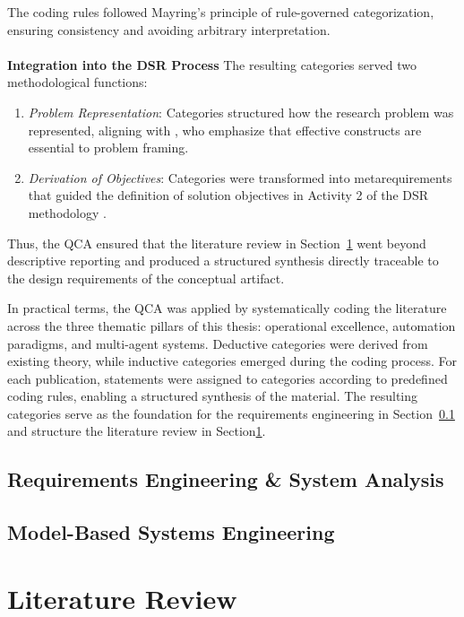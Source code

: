 The coding rules followed Mayring’s principle of rule-governed categorization, ensuring consistency and avoiding arbitrary interpretation.\\\\
\textbf{Integration into the DSR Process} \quad The resulting categories served two methodological functions:
\begin{enumerate}
    \item \textit{Problem Representation}: Categories structured how the research problem was represented, aligning with \textcite{hevnerDesignScienceInformation2004}, who emphasize that effective constructs are essential to problem framing.
    \item \textit{Derivation of Objectives}: Categories were transformed into metarequirements that guided the definition of solution objectives in Activity 2 of the DSR methodology \parencite{peffersDesignScienceMethodology2007}.
\end{enumerate}

Thus, the QCA ensured that the literature review in Section~\ref{sec:lit-rev} went beyond descriptive reporting and produced a structured synthesis directly traceable to the design requirements of the conceptual artifact.

In practical terms, the QCA was applied by systematically coding the literature across the three thematic pillars of this thesis: operational excellence, automation paradigms, and multi-agent systems. Deductive categories were derived from existing theory, while inductive categories emerged during the coding process. For each publication, statements were assigned to categories according to predefined coding rules, enabling a structured synthesis of the material. The resulting categories serve as the foundation for the requirements engineering in Section~\ref{subsec:re\&sa} and structure the literature review in Section\ref{sec:lit-rev}.

\subsection{Requirements Engineering \& System Analysis}\label{subsec:re\&sa}

\subsection{Model-Based Systems Engineering}\label{subsec:mbse}

\section{Literature Review}\label{sec:lit-rev}

